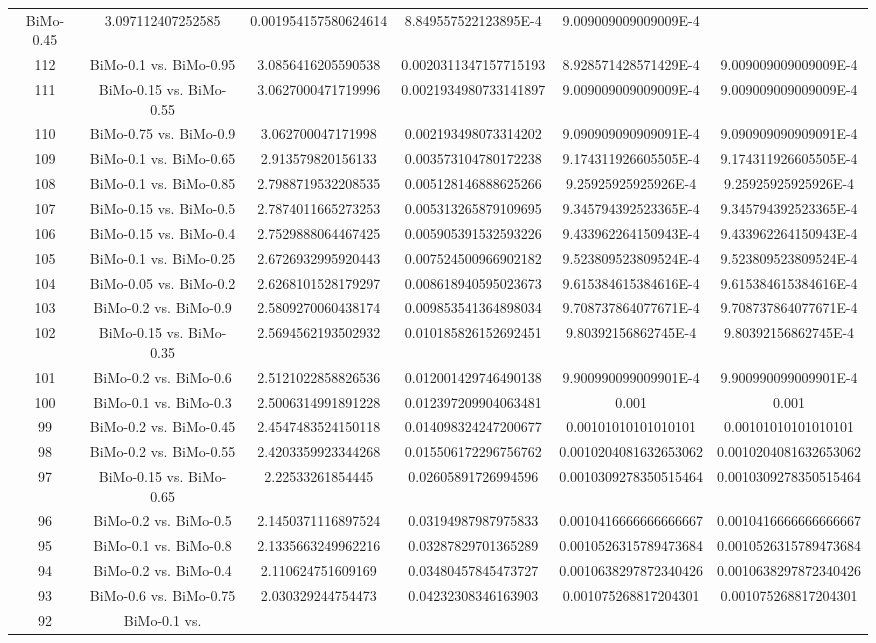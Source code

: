 \documentclass[a4paper,10pt]{article}
\begin{document}
\begin{landscape}
\begin{table}[!htp]
\begin{tabular}{cccccc}
BiMo-0.45&3.097112407252585&0.001954157580624614&8.849557522123895E-4&9.009009009009009E-4\\112&BiMo-0.1 vs. BiMo-0.95&3.0856416205590538&0.0020311347157715193&8.928571428571429E-4&9.009009009009009E-4\\111&BiMo-0.15 vs. BiMo-0.55&3.0627000471719996&0.0021934980733141897&9.009009009009009E-4&9.009009009009009E-4\\110&BiMo-0.75 vs. BiMo-0.9&3.062700047171998&0.002193498073314202&9.090909090909091E-4&9.090909090909091E-4\\109&BiMo-0.1 vs. BiMo-0.65&2.913579820156133&0.003573104780172238&9.174311926605505E-4&9.174311926605505E-4\\108&BiMo-0.1 vs. BiMo-0.85&2.7988719532208535&0.005128146888625266&9.25925925925926E-4&9.25925925925926E-4\\107&BiMo-0.15 vs. BiMo-0.5&2.7874011665273253&0.005313265879109695&9.345794392523365E-4&9.345794392523365E-4\\106&BiMo-0.15 vs. BiMo-0.4&2.7529888064467425&0.005905391532593226&9.433962264150943E-4&9.433962264150943E-4\\105&BiMo-0.1 vs. BiMo-0.25&2.6726932995920443&0.007524500966902182&9.523809523809524E-4&9.523809523809524E-4\\104&BiMo-0.05 vs. BiMo-0.2&2.6268101528179297&0.008618940595023673&9.615384615384616E-4&9.615384615384616E-4\\103&BiMo-0.2 vs. BiMo-0.9&2.5809270060438174&0.009853541364898034&9.708737864077671E-4&9.708737864077671E-4\\102&BiMo-0.15 vs. BiMo-0.35&2.5694562193502932&0.010185826152692451&9.80392156862745E-4&9.80392156862745E-4\\101&BiMo-0.2 vs. BiMo-0.6&2.5121022858826536&0.012001429746490138&9.900990099009901E-4&9.900990099009901E-4\\100&BiMo-0.1 vs. BiMo-0.3&2.5006314991891228&0.012397209904063481&0.001&0.001\\99&BiMo-0.2 vs. BiMo-0.45&2.4547483524150118&0.014098324247200677&0.00101010101010101&0.00101010101010101\\98&BiMo-0.2 vs. BiMo-0.55&2.4203359923344268&0.015506172296756762&0.0010204081632653062&0.0010204081632653062\\97&BiMo-0.15 vs. BiMo-0.65&2.22533261854445&0.02605891726994596&0.0010309278350515464&0.0010309278350515464\\96&BiMo-0.2 vs. BiMo-0.5&2.1450371116897524&0.03194987987975833&0.0010416666666666667&0.0010416666666666667\\95&BiMo-0.1 vs. BiMo-0.8&2.1335663249962216&0.03287829701365289&0.0010526315789473684&0.0010526315789473684\\94&BiMo-0.2 vs. BiMo-0.4&2.110624751609169&0.03480457845473727&0.0010638297872340426&0.0010638297872340426\\93&BiMo-0.6 vs. BiMo-0.75&2.030329244754473&0.04232308346163903&0.001075268817204301&0.001075268817204301\\92&BiMo-0.1 vs. 
\end{tabular}
\end{table}
\end{landscape}
\end{document}
